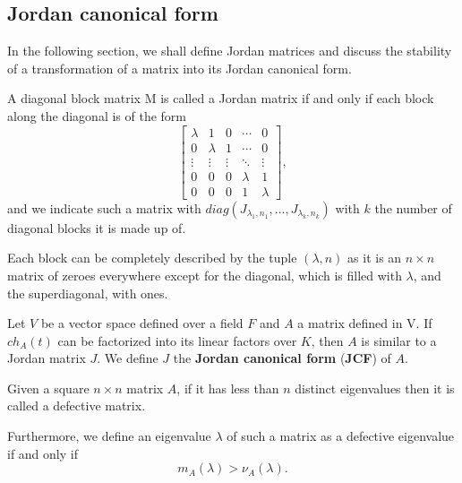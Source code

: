 \subsection*{Jordan canonical form}
In the following section, we shall define Jordan matrices and discuss the stability of a transformation of a matrix into its
Jordan canonical form.
\begin{definition}
    A diagonal block matrix M is called a Jordan matrix if and only if each block along the diagonal is of the form
    \[
        \begin{bmatrix}
            \lambda     &    1         &    0     &   \cdots   &    0    \\
                0       &    \lambda   &    1     &   \cdots   &    0    \\
            \vdots      &    \vdots    &  \vdots  &   \ddots   & \vdots  \\
                0       &       0      &     0    &  \lambda   &    1    \\
                0       &       0      &     0    &     1      & \lambda
        \end{bmatrix},
    \]
    and we indicate such a matrix with
    \(diag(J_{\lambda_{1}, n_{1}}, ..., J_{\lambda_{k}, n_{k}})\) with \(k\) the number of diagonal blocks it is made up of.

    Each block can be completely described by the tuple \((\lambda, n)\) as it is an \(n \times n\) matrix of zeroes everywhere
    except for the diagonal, which is filled with \(\lambda\), and the superdiagonal, with ones.
\end{definition}

\begin{remark}
    Let \(V\) be a vector space defined over a field \(F\) and \(A\) a matrix defined in V. If \(ch_{A}(t)\) can be factorized into
    its linear factors over \(K\), then \(A\) is similar to a Jordan matrix \(J\). We define \(J\) the \textbf{Jordan
    canonical form} (\textbf{JCF}) of \(A\).
\end{remark}

\begin{definition}
    Given a square \(n \times n\) matrix \(A\), if it has less than \(n\) distinct eigenvalues then it is called a
    defective matrix.

    Furthermore, we define an eigenvalue \(\lambda\) of such a matrix as a defective eigenvalue if and only if
    \[
        m_{A}(\lambda) > \nu_{A}(\lambda).
    \]
\end{definition}

